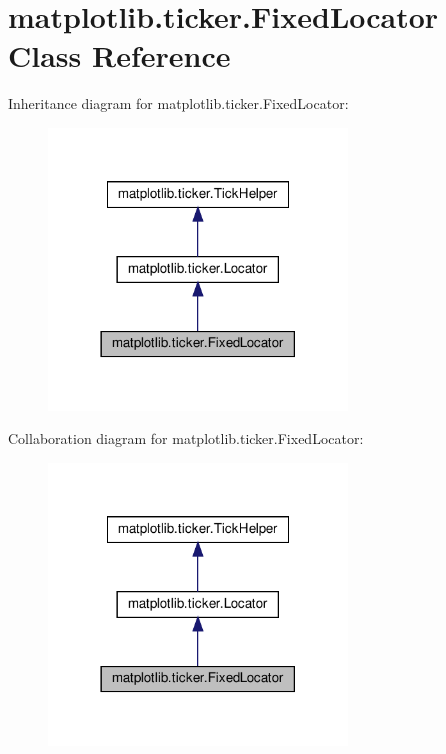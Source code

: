 \hypertarget{classmatplotlib_1_1ticker_1_1FixedLocator}{}\section{matplotlib.\+ticker.\+Fixed\+Locator Class Reference}
\label{classmatplotlib_1_1ticker_1_1FixedLocator}


Inheritance diagram for matplotlib.\+ticker.\+Fixed\+Locator\+:
\nopagebreak
\begin{figure}[H]
\begin{center}
\leavevmode
\includegraphics[width=225pt]{classmatplotlib_1_1ticker_1_1FixedLocator__inherit__graph}
\end{center}
\end{figure}


Collaboration diagram for matplotlib.\+ticker.\+Fixed\+Locator\+:
\nopagebreak
\begin{figure}[H]
\begin{center}
\leavevmode
\includegraphics[width=225pt]{classmatplotlib_1_1ticker_1_1FixedLocator__coll__graph}
\end{center}
\end{figure}
